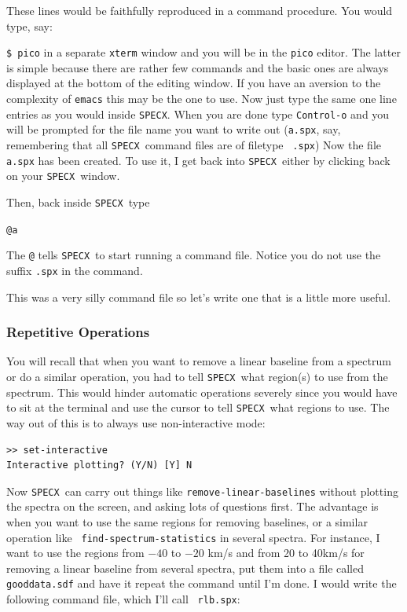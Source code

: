 \documentclass[11pt,twoside]{article}
\newcommand{\SPECX}{{\tt SPECX}}
\begin{document}
These lines would be faithfully reproduced in a command procedure.
You would type, say:

\verb|$ pico|
in a separate {\tt xterm} window and you will be in the {\tt pico}
editor. The latter is simple because there are rather few commands and
the basic ones are always displayed at the bottom of the editing
window. If you have an aversion to the complexity of {\tt emacs} this
may be the one to use. Now just type the same one line entries as you
would inside \SPECX . When you are done type {\tt Control-o} and you
will be prompted for the file name you want to write out ({\tt{a.spx}},
say, remembering that all \SPECX\ command files are of filetype {\tt
.spx}) Now the file {\tt a.spx} has been created.  To use it, I get
back into \SPECX\ either by clicking back on your \SPECX\ window.

Then, back inside \SPECX\ type

\verb|@a|

The {\tt @} tells \SPECX\ to start running a command file.  Notice you
do not use the suffix {\tt .spx} in the command.

This was a very silly command file so let's write one that is a little
more useful.


\subsubsection{Repetitive Operations}
\label{sec:specx_9.2}

You will recall that when you want to remove a linear baseline from a
spectrum or do a similar operation, you had to tell \SPECX\ what
region(s) to use from the spectrum.  This would hinder automatic
operations severely since you would have to sit at the terminal and
use the cursor to tell \SPECX\ what regions to use.  The way out of
this is to always use non-interactive mode:

\begin{verbatim}
>> set-interactive
Interactive plotting? (Y/N) [Y] N
\end{verbatim}

Now \SPECX\ can carry out things like {\tt remove-linear-baselines}
without plotting the spectra on the screen, and asking lots of
questions first.  The advantage is when you want to use the same
regions for removing baselines, or a similar operation like {\tt
find-spectrum-statistics} in several spectra.  For instance, I want to
use the regions from $-40$ to $-20$ km/s and from 20 to 40km/s for
removing a linear baseline from several spectra, put them into a file
called {\tt gooddata.sdf} and have it repeat the command until I'm
done.  I would write the following command file, which I'll call {\tt
rlb.spx}:
\end{document}
